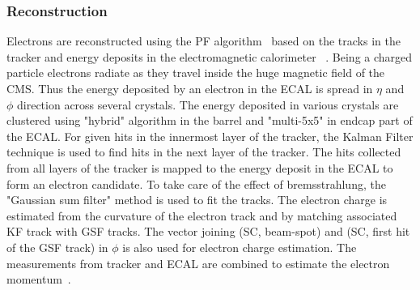\subsubsection{Reconstruction}
Electrons are reconstructed using the PF algorithm~\cite{CMS-PAS-PFT-09-001, CMS-PAS-PFT-10-001} 
based on the tracks in the tracker and energy deposits in the electromagnetic calorimeter
~\cite{Khachatryan:2015hwa}. Being a charged particle electrons radiate as they travel inside the huge
magnetic field of the CMS. Thus the energy deposited by an electron in the ECAL is
spread in $\eta$ and $\phi$ direction across several crystals. The energy deposited
in various crystals are clustered using "hybrid" algorithm in the barrel and "multi-5x5"
in endcap part of the ECAL. For given hits in the innermost layer of the tracker, the 
Kalman Filter technique is used to find hits in the next layer of the tracker. The hits collected
from all layers of the tracker is mapped to the energy deposit in the ECAL to form 
an electron candidate. To take care of the effect of bremsstrahlung, the "Gaussian sum 
filter" method is used to fit the tracks. The electron charge is estimated from the 
curvature of the electron track and by matching associated KF track with GSF tracks. The vector joining (SC, beam-spot) and (SC, first hit of the GSF track) in $\phi$ is also used for
electron charge estimation. The measurements from tracker and ECAL are combined to estimate
the electron momentum~\cite{Khachatryan:2015hwa}.

